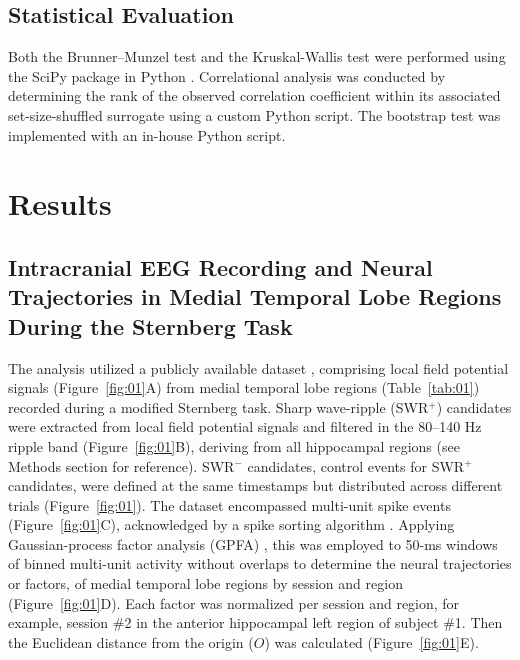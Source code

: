 \documentclass[final,3p,times,twocolumn]{elsarticle}
\begin{document}
\subsection{Statistical Evaluation}
Both the Brunner--Munzel test and the Kruskal-Wallis test were performed using the SciPy package in Python \cite{virtanen_scipy_2020}. Correlational analysis was conducted by determining the rank of the observed correlation coefficient within its associated set-size-shuffled surrogate using a custom Python script. The bootstrap test was implemented with an in-house Python script.
\label{sec:methods}
\section{Results}
\subsection{Intracranial EEG Recording and Neural Trajectories in Medial Temporal Lobe Regions During the Sternberg Task}

The analysis utilized a publicly available dataset \cite{boran_dataset_2020}, comprising local field potential signals (Figure~\ref{fig:01}A) from medial temporal lobe regions (Table~\ref{tab:01}) recorded during a modified Sternberg task. Sharp wave-ripple (SWR$^+$) candidates were extracted from local field potential signals and filtered in the 80--140 Hz ripple band (Figure~\ref{fig:01}B), deriving from all hippocampal regions (see Methods section for reference). SWR$^-$ candidates, control events for SWR$^+$ candidates, were defined at the same timestamps but distributed across different trials (Figure~\ref{fig:01}). The dataset encompassed multi-unit spike events (Figure~\ref{fig:01}C), acknowledged by a spike sorting algorithm \cite{niediek_reliable_2016}. Applying Gaussian-process factor analysis (GPFA) \cite{yu_gaussian-process_2009}, this was employed to 50-ms windows of binned multi-unit activity without overlaps to determine the neural trajectories or factors, of medial temporal lobe regions by session and region (Figure~\ref{fig:01}D). Each factor was normalized per session and region, for example, session \#2 in the anterior hippocampal left region of subject \#1. Then the Euclidean distance from the origin ($O$) was calculated (Figure~\ref{fig:01}E).
\end{document}
